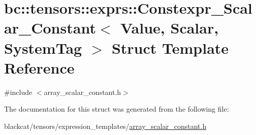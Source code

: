 \hypertarget{structbc_1_1tensors_1_1exprs_1_1Constexpr__Scalar__Constant}{}\section{bc\+:\+:tensors\+:\+:exprs\+:\+:Constexpr\+\_\+\+Scalar\+\_\+\+Constant$<$ Value, Scalar, System\+Tag $>$ Struct Template Reference}
\label{structbc_1_1tensors_1_1exprs_1_1Constexpr__Scalar__Constant}


{\ttfamily \#include $<$array\+\_\+scalar\+\_\+constant.\+h$>$}



The documentation for this struct was generated from the following file\+:\begin{DoxyCompactItemize}
\item 
blackcat/tensors/expression\+\_\+templates/\hyperlink{array__scalar__constant_8h}{array\+\_\+scalar\+\_\+constant.\+h}\end{DoxyCompactItemize}
